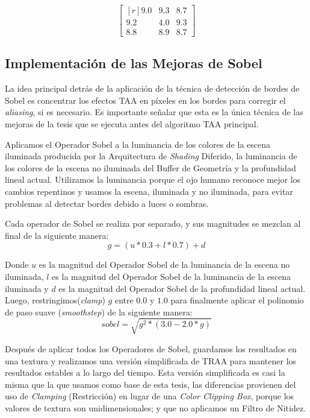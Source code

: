 \documentclass[pregrado]{tesis-usb} %
\begin{document}
\begin{equation}\label{eq:depth_var_aliased}
\begin{bmatrix*}[r]
9.0 &  9.3 & 8.7 \\
9.2 &  4.0 & 9.3 \\
8.8 &  8.9 & 8.7
\end{bmatrix*}
\end{equation}

\subsection{Implementación de las Mejoras de Sobel}
La idea principal detrás de la aplicación de la técnica de detección de bordes de Sobel es concentrar los efectos TAA en píxeles en los bordes para corregir el \textit{aliasing}, si es necesario. Es importante señalar que esta es la única técnica de las mejoras de la tesis que se ejecuta antes del algoritmo TAA principal.

Aplicamos el Operador Sobel a la luminancia de los colores de la escena iluminada producida por la Arquitectura de \textit{Shading} Diferido, la luminancia de los colores de la escena no iluminada del Buffer de Geometría y la profundidad lineal actual. Utilizamos la luminancia porque el ojo humano reconoce mejor los cambios repentinos y usamos la escena, iluminada y no iluminada, para evitar problemas al detectar bordes debido a luces o sombras.

Cada operador de Sobel se realiza por separado, y sus magnitudes se mezclan al final de la siguiente manera:
\begin{equation} \label{eq:sobel_g}
	g=(u*0.3 +l*0.7)+d 
\end{equation}

Donde $u$ es la magnitud del Operador Sobel de la luminancia de la escena no iluminada, $l$ es la magnitud del Operador Sobel de la luminancia de la escena iluminada y $d$ es la magnitud del Operador Sobel de la profundidad lineal actual. \\

Luego, restringimos(\textit{clamp}) $g$ entre $0.0$ y $1.0$ para finalmente aplicar el polinomio de paso suave (\textit{smoothstep}) de la siguiente manera:
\begin{equation} \label{eq:sobel_sqrt}
sobel=\sqrt{g^2*(3.0-2.0*g)} 
\end{equation}

Después de aplicar todos los Operadores de Sobel, guardamos los resultados en una textura y realizamos una versión simplificada de TRAA para mantener los resultados estables a lo largo del tiempo. Esta versión simplificada es casi la misma que la que usamos como base de esta tesis, las diferencias provienen del uso de \textit{Clamping} (Restricción) en lugar de una \textit{Color Clipping Box}, porque los valores de textura son unidimensionales; y que no aplicamos un Filtro de Nitidez.
\end{document}
